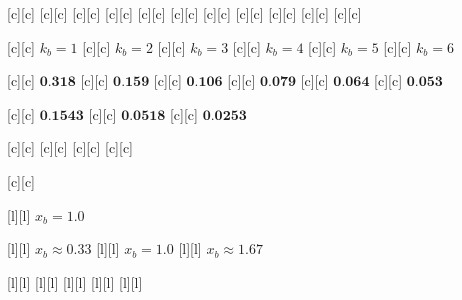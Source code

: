  [c][c] {}
 [c][c] {}
 [c][c] {}
 [c][c] {}
 [c][c] {}
[c][c] {}
[c][c] {}
[c][c] {}
[c][c] {}
[c][c] {}
[c][c] {}



[c][c] {\tiny $k_{b} = 1$}
[c][c] {\tiny $k_{b} = 2$}
[c][c] {\tiny $k_{b} = 3$}
[c][c] {\tiny $k_{b} = 4$}
[c][c] {\tiny $k_{b} = 5$}
[c][c] {\tiny $k_{b} = 6$}

[c][c] {\tiny $\textbf{0.318}$}
[c][c] {\tiny $\textbf{0.159}$}
[c][c] {\tiny $\textbf{0.106}$}
[c][c] {\tiny $\textbf{0.079}$}
[c][c] {\tiny $\textbf{0.064}$}
[c][c] {\tiny $\textbf{0.053}$}

[c][c] {\tiny $\textbf{0.1543}$}
[c][c] {\tiny $\textbf{0.0518}$}
[c][c] {\tiny $\textbf{0.0253}$}

[c][c] {}
[c][c] {}
[c][c]   {}
[c][c]   {}

[c][c]  {}

[l][l] {\tiny $x_{b} = 1.0$}

[l][l] {\tiny $x_{b} \approx 0.33$}
[l][l] {\tiny $x_{b} = 1.0$}
[l][l] {\tiny $x_{b} \approx 1.67$}

[l][l] {}
[l][l] {}
[l][l] {}
[l][l] {}
[l][l] {}

